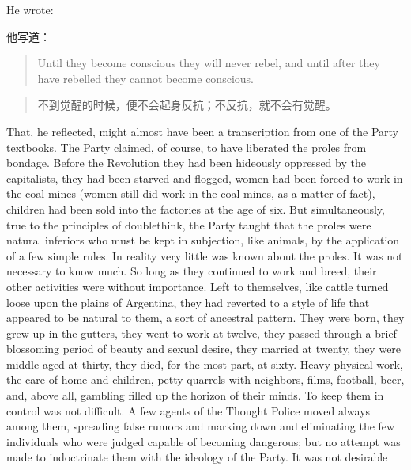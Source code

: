\begin{paracol}{2}
\switchcolumn*

He wrote:

\switchcolumn

他写道：

\switchcolumn*

\begin{quotation}
Until they become conscious they will never rebel, and until after
they have rebelled they cannot become conscious.
\end{quotation}

\switchcolumn

\begin{quotation}
不到觉醒的时候，便不会起身反抗；不反抗，就不会有觉醒。
\end{quotation}

\switchcolumn*

That, he reflected, might almost have been a transcription from one of
the Party textbooks. The Party claimed, of course, to have liberated the
proles from bondage. Before the Revolution they had been hideously
oppressed by the capitalists, they had been starved and flogged, women
had been forced to work in the coal mines (women still did work in the
coal mines, as a matter of fact), children had been sold into the
factories at the age of six. But simultaneously, true to the principles
of doublethink, the Party taught that the proles were natural inferiors
who must be kept in subjection, like animals, by the application of a
few simple rules. In reality very little was known about the proles. It
was not necessary to know much. So long as they continued to work and
breed, their other activities were without importance. Left to
themselves, like cattle turned loose upon the plains of Argentina, they
had reverted to a style of life that appeared to be natural to them, a
sort of ancestral pattern. They were born, they grew up in the gutters,
they went to work at twelve, they passed through a brief blossoming
period of beauty and sexual desire, they married at twenty, they were
middle-aged at thirty, they died, for the most part, at sixty. Heavy
physical work, the care of home and children, petty quarrels with
neighbors, films, football, beer, and, above all, gambling filled up the
horizon of their minds. To keep them in control was not difficult. A few
agents of the Thought Police moved always among them, spreading false
rumors and marking down and eliminating the few individuals who were
judged capable of becoming dangerous; but no attempt was made to
indoctrinate them with the ideology of the Party. It was not desirable

\end{paracol}
